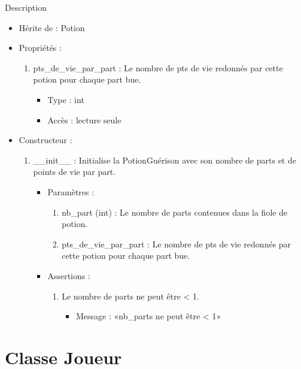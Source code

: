 \documentclass[12pt,pdftex,oneside]{article}
\begin{document}
  Description

  \begin{itemize}
  \item Hérite de : Potion
  \item Propriétés : 
    \begin{enumerate}
    \item pts\_de\_vie\_par\_part : Le nombre de pts de vie redonnés par cette
      potion pour chaque part bue.
          \begin{itemize}
          \item Type : int
          \item Accès : lecture seule
          \end{itemize}

    \end{enumerate}

  \item Constructeur : 

  \begin{enumerate}
  \item \_\_init\_\_ : Initialise la PotionGuérison avec son nombre de parts et
    de points de vie par part.
    \begin{itemize}
    \item Paramètres : 
      \begin{enumerate}
      \item nb\_part (int) : Le nombre de parts contenues dans la fiole de potion.
      \item pts\_de\_vie\_par\_part : Le nombre de pts de vie redonnés par cette
      potion pour chaque part bue.
      \end{enumerate}
      \item Assertions : 
        \begin{enumerate}
        \item Le nombre de parts ne peut être < 1.
          \begin{itemize}
          \item Message : «nb\_parts ne peut être < 1»
          \end{itemize}
        \end{enumerate}
    \end{itemize}
  \end{enumerate}
  \end{itemize}

  \section {Classe Joueur}
\end{document}
